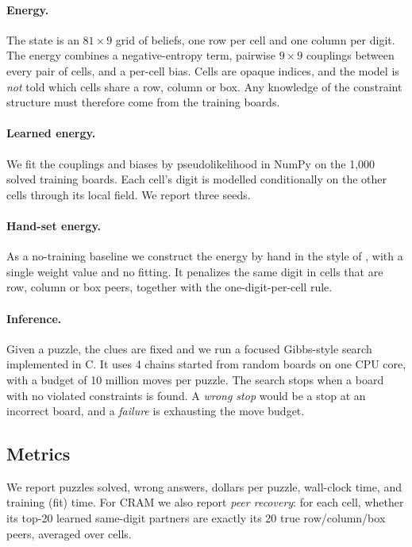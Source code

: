\documentclass{article} %
\begin{document}
\paragraph{Energy.}
The state is an $81\times 9$ grid of beliefs, one row per cell and one column per digit. The energy combines a negative-entropy term, pairwise $9\times 9$ couplings between every pair of cells, and a per-cell bias. Cells are opaque indices, and the model is \emph{not} told which cells share a row, column or box. Any knowledge of the constraint structure must therefore come from the training boards.

\paragraph{Learned energy.}
We fit the couplings and biases by pseudolikelihood \citep{besag1975statistical} in NumPy on the 1,000 solved training boards. Each cell's digit is modelled conditionally on the other cells through its local field. We report three seeds.

\paragraph{Hand-set energy.}
As a no-training baseline we construct the energy by hand in the style of \citet{hopfield1985neural}, with a single weight value and no fitting. It penalizes the same digit in cells that are row, column or box peers, together with the one-digit-per-cell rule.

\paragraph{Inference.}
Given a puzzle, the clues are fixed and we run a focused Gibbs-style search \citep{geman1984stochastic} implemented in C. It uses 4 chains started from random boards on one CPU core, with a budget of 10 million moves per puzzle. The search stops when a board with no violated constraints is found. A \emph{wrong stop} would be a stop at an incorrect board, and a \emph{failure} is exhausting the move budget.

\subsection{Metrics}
We report puzzles solved, wrong answers, dollars per puzzle, wall-clock time, and training (fit) time. For CRAM we also report \emph{peer recovery}: for each cell, whether its top-20 learned same-digit partners are exactly its 20 true row/column/box peers, averaged over cells.
\end{document}
